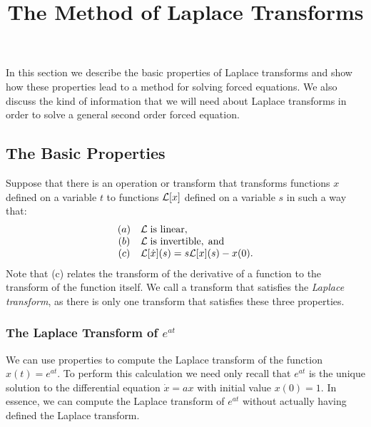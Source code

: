 \documentclass{ximera}
\title{The Method of Laplace Transforms}
\begin{document}
\begin{abstract}
\end{abstract}
\maketitle

 \label{S:13.1}

In this section we describe the basic properties of Laplace transforms and 
show how these properties lead to a method for solving forced equations.   
We also discuss the kind of information that we will need about Laplace 
transforms in order to solve a general second order forced equation. 

\subsection*{The Basic Properties}

Suppose that there is an operation or transform that transforms functions $x$ 
defined on a variable $t$ to functions ${\cal L}[x]$ defined on a variable 
$s$ in such a way that:
\begin{equation}  \label{Tprops}
\begin{array}{cl}
(a) & {\cal L}\; \mbox{is linear},\\
(b) & {\cal L}\; \mbox{is invertible},\; \mbox{and}\\
(c) & {\cal L}[\dot{x}](s) = s{\cal L}[x](s) - x(0).
\end{array}
\end{equation}
Note that (c) relates the transform of the derivative of a 
function to the transform of the function itself.  We call a transform that 
satisfies  the {\em Laplace transform\/}, as there is only one 
transform that satisfies these three properties.

\subsubsection*{The Laplace Transform of $e^{at}$}

We can use properties  to compute the Laplace transform of the
function $x(t) = e^{at}$.  To perform this calculation we need only recall 
that $e^{at}$ is the unique solution to the differential equation 
$\dot{x}=ax$ with initial value $x(0)=1$.  In essence, we can compute the 
Laplace transform of $e^{at}$ without actually having defined the Laplace 
transform.
\end{document}
